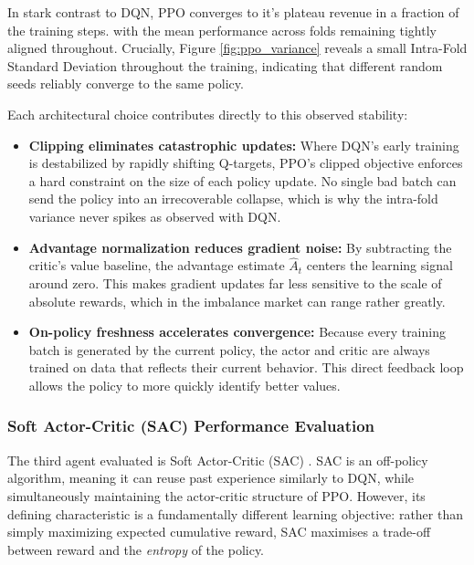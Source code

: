             In stark contrast to DQN, PPO converges to it's plateau revenue in a fraction of the training steps. with the mean performance across folds remaining tightly aligned throughout. Crucially, Figure \ref{fig:ppo_variance} reveals a small Intra-Fold Standard Deviation throughout the training, indicating that different random seeds reliably converge to the same policy.

            Each architectural choice contributes directly to this observed stability:
            \begin{itemize}
                \item \textbf{Clipping eliminates catastrophic updates:} Where DQN's early training is destabilized by rapidly shifting Q-targets, PPO's clipped objective enforces a hard constraint on the size of each policy update. No single bad batch can send the policy into an irrecoverable collapse, which is why the intra-fold variance never spikes as observed with DQN.
                \item \textbf{Advantage normalization reduces gradient noise:} By subtracting the critic's value baseline, the advantage estimate $\hat{A}_t$ centers the learning signal around zero. This makes gradient updates far less sensitive to the scale of absolute rewards, which in the imbalance market can range rather greatly.
                \item \textbf{On-policy freshness accelerates convergence:} Because every training batch is generated by the current policy, the actor and critic are always trained on data that reflects their current behavior. This direct feedback loop allows the policy to more quickly identify better values.
            \end{itemize}


            \subsubsection{Soft Actor-Critic (SAC) Performance Evaluation}

            The third agent evaluated is Soft Actor-Critic (SAC) \cite{haarnoja2018soft}. SAC is an off-policy algorithm, meaning it can reuse past experience similarly to DQN, while simultaneously maintaining the actor-critic structure of PPO. However, its defining characteristic is a fundamentally different learning objective: rather than simply maximizing expected cumulative reward, SAC maximises a trade-off between reward and the \textit{entropy} of the policy.

